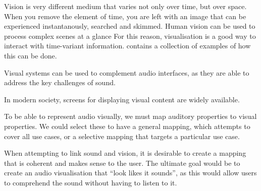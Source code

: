 Vision is very different medium that varies not only over time, but over space. When you remove the element of time,
you are left with an image that can be experienced instantanously, searched and skimmed.
Human vision can be used to process complex scenes at a glance
For this reason, visualisation is a good way to interact with time-variant information.
\citet{Aigner2011} contains a collection of examples of how this can be done.

Visual systems can be used to complement audio interfaces, as they are able to address the key challenges of sound.

In modern society, screens for displaying visual content are widely available.

To be able to represent audio visually, we must map auditory properties to visual properties. We could select these 
to have a general mapping, which attempts to cover all use cases, or a selective mapping that targets a particular use
case.

When attempting to link sound and vision, it is desirable to create a mapping that is coherent and makes sense to the
user. The ultimate goal would be to create an audio visualisation that ``look likes it sounds'', as this would
allow users to comprehend the sound without having to listen to it.




